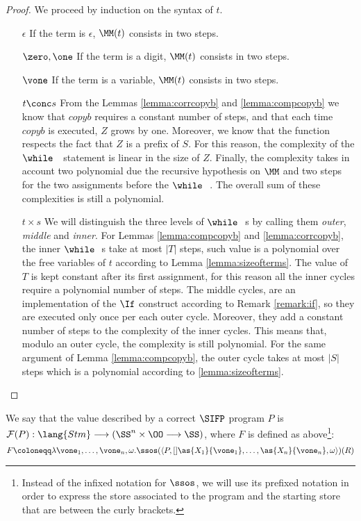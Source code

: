 \begin{proof}
We proceed by induction on the syntax of $t$.
\begin{itemize}
\item[$\epsilon$] If the term is $\epsilon$, $\MM(t)$ consists in two steps.
\item[$\zero,\one$] If the term is a digit,  $\MM(t)$ consists in two steps.
\item[$\vone$] If the term is a variable, $\MM(t)$ consists in two steps.
\item[$t \conc s$] From the Lemmas \ref{lemma:corrcopyb} and \ref{lemma:compcopyb} we know that $copyb$ requires a constant number of steps, and that each time $copyb$ is executed, $Z$ grows by one. Moreover, we know that the function respects the fact that $Z$ is a prefix of $S$. For this reason, the complexity of the $\while\ \ $ statement is linear in the size of $Z$. Finally, the complexity takes in account two polynomial due the recursive hypothesis on $\MM$ and two steps for the two assignments before the $\while\ \ $. The overall sum of these complexities is still a polynomial.
\item[$t \times s$] We will distinguish the three levels of $\while\ \ $s by calling them \emph{outer}, \emph{middle} and \emph{inner}. For Lemmas \ref{lemma:compcopyb} and \ref{lemma:corrcopyb}, the inner $\while\ \ $s take at most $|T|$ steps, such value is a polynomial over the free variables of $t$ according to Lemma \ref{lemma:sizeofterms}. The value of $T$ is kept constant after its first assignment, for this reason all the inner cycles require a polynomial number of steps. The middle cycles, are an implementation of the $\If$ construct according to Remark \ref{remark:if}, so they are executed only once per each outer cycle. Moreover, they add a constant number of steps to the complexity of the inner cycles. This means that, modulo an outer cycle, the complexity is still polynomial. For the same argument of Lemma \ref{lemma:compcopyb}, the outer cycle takes at most $|S|$ steps which is a polynomial according to \ref{lemma:sizeofterms}.
\end{itemize}
\end{proof}

\begin{defn}
We say that the value described by a correct $\SIFP$ program $P$ is $\mathcal F(P): \lang{Stm} \longrightarrow (\SS^n \times \OO \longrightarrow \SS)$, where $F$ is defined as above\footnote{Instead of the infixed notation for $\ssos$, we will use its prefixed notation in order to express the store associated to the program and the starting store that are between the curly brackets.}:
\[
F\coloneqq \lambda \vone_1, \ldots, \vone_n, \omega.\ssos(\langle P, []\as {X_1} {\vone_1}, \ldots, \as {X_n} {\vone_n}, \omega\rangle)(R)
\]
\end{defn}

